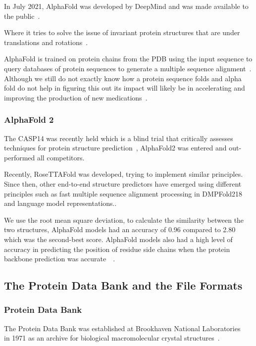 \documentclass[]{final_report}
\begin{document}
In July 2021, AlphaFold was developed by DeepMind and was made available to
the public~\cite{tunyasuvunakool_highly_2021}. 

Where it tries to solve the issue of invariant protein structures that are under translations and rotations~\cite{baldi_principled_nodate}.

AlphaFold is trained on protein chains from the PDB using the input sequence to query databases of protein sequences to generate a multiple sequence alignment~\cite{jumper_highly_2021}. Although we still do not exactly know how a protein sequence folds and alpha fold do not help in figuring this out its impact will likely be in accelerating and improving the production of new medications~\cite{nussinov_alphafold_2022}.


\subsubsection{AlphaFold 2}

The CASP14 was recently held which is a blind trial that critically assesses
techniques for protein structure prediction~\cite{david_alphafold_2022}, AlphaFold2 was entered and out-performed all competitors. 

Recently, RoseTTAFold was developed, trying to implement similar principles. Since then, other end-to-end structure predictors have emerged using different principles such as fast multiple sequence alignment processing in DMPFold218 and language model representations.\cite{bryant_improved_2022}.

We use the root mean square deviation, to calculate the similarity between the two structures, AlphaFold models had an accuracy of 0.96 compared to 2.80 which was the second-best score. AlphaFold models also had a high level of accuracy in predicting the position of residue side chains when the protein backbone prediction was accurate~\cite{david_alphafold_2022}~\cite{jumper_highly_2021}.

\subsection{The Protein Data Bank and the File Formats}

\subsubsection{Protein Data Bank}

The Protein Data Bank was established at Brookhaven National Laboratories ~\cite{bernstein_protein_1977} in 1971 as an archive for biological macromolecular crystal structures~\cite{berman_protein_2000}.
\end{document}
